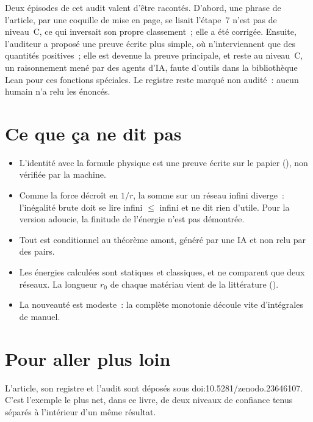 Deux épisodes de cet audit valent d'être racontés. D'abord, une phrase de l'article, par une coquille de mise en
page, se lisait \og l'étape~7 n'est pas de niveau~C\fg, ce qui inversait son propre classement~; elle a été corrigée.
Ensuite, l'auditeur a proposé une preuve écrite plus simple, où n'interviennent que des quantités positives~;
elle est devenue la preuve principale, et reste au niveau~C, un raisonnement mené par des agents d'IA, faute d'outils dans la bibliothèque Lean pour
ces fonctions spéciales. Le registre reste marqué \og non audité\fg~: aucun humain n'a relu les énoncés.

\section*{Ce que ça ne dit pas}

\begin{limite}
\begin{itemize}
\item L'identité avec la formule physique est une preuve écrite sur le papier (), non vérifiée par la machine.
\item Comme la force décroît en $1/r$, la somme sur un réseau infini diverge~: l'inégalité brute doit se lire
  \og infini $\leq$ infini\fg{} et ne dit rien d'utile. Pour la version adoucie, la finitude de l'énergie n'est
  pas démontrée.
\item Tout est conditionnel au théorème amont, généré par une IA et non relu par des pairs.
\item Les énergies calculées sont statiques et classiques, et ne comparent que deux réseaux. La longueur $r_0$ de
  chaque matériau vient de la littérature ().
\item La nouveauté est modeste~: la complète monotonie découle vite d'intégrales de manuel.
\end{itemize}
\end{limite}

\section*{Pour aller plus loin}

L'article, son registre et l'audit sont déposés sous doi:10.5281/\allowbreak zenodo.23646107. C'est l'exemple le plus net, dans
ce livre, de deux niveaux de confiance tenus séparés à l'intérieur d'un même résultat.
